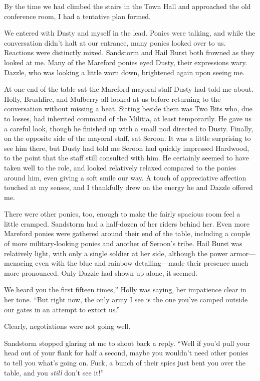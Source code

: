 By the time we had climbed the stairs in the Town Hall and approached the old conference room, I had a tentative plan formed.

We entered with Dusty and myself in the lead. Ponies were talking, and while the conversation didn’t halt at our entrance, many ponies looked over to us. Reactions were distinctly mixed. Sandstorm and Hail Burst both frowned as they looked at me. Many of the Mareford ponies eyed Dusty, their expressions wary. Dazzle, who was looking a little worn down, brightened again upon seeing me.

At one end of the table sat the Mareford mayoral staff Dusty had told me about. Holly, Brushfire, and Mulberry all looked at us before returning to the conversation without missing a beat. Sitting beside them was Two Bits who, due to losses, had inherited command of the Militia, at least temporarily. He gave us a careful look, though he finished up with a small nod directed to Dusty. Finally, on the opposite side of the mayoral staff, sat Seroon. It was a little surprising to see him there, but Dusty had told me Seroon had quickly impressed Hardwood, to the point that the staff still consulted with him. He certainly seemed to have taken well to the role, and looked relatively relaxed compared to the ponies around him, even giving a soft smile our way. A touch of appreciative affection touched at my senses, and I thankfully drew on the energy he and Dazzle offered me.

There were other ponies, too, enough to make the fairly spacious room feel a little cramped. Sandstorm had a half-dozen of her riders behind her. Even more Mareford ponies were gathered around their end of the table, including a couple of more military-looking ponies and another of Seroon’s tribe. Hail Burst was relatively light, with only a single soldier at her side, although the power armor—menacing even with the blue and rainbow detailing—made their presence much more pronounced. Only Dazzle had shown up alone, it seemed.

\leavevmode{}We heard you the first fifteen times,” Holly was saying, her impatience clear in her tone. “But right now, the only army I see is the one you’ve camped outside our gates in an attempt to extort us.”

Clearly, negotiations were not going well.

Sandstorm stopped glaring at me to shoot back a reply. “Well if you’d pull your head out of your flank for half a second, maybe you wouldn’t need other ponies to tell you what’s going on. Fuck, a bunch of their spies just bent you over the table, and you \textit{still} don’t see it!”

